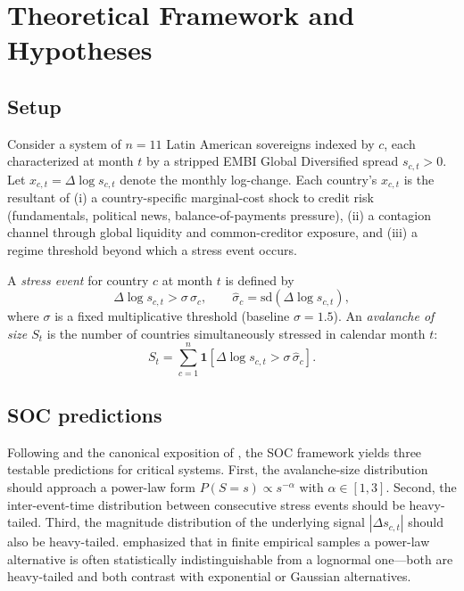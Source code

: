\documentclass[12pt,a4paper]{article}
\newcommand{\dlogs}{\Delta\log s}
\begin{document}
\section{Theoretical Framework and Hypotheses}
\label{sec:theory}

\subsection{Setup}
Consider a system of $n=11$ Latin American sovereigns indexed by $c$, each
characterized at month $t$ by a stripped EMBI Global Diversified spread
$s_{c,t}>0$. Let $x_{c,t}=\dlogs_{c,t}$ denote the monthly log-change. Each
country's $x_{c,t}$ is the resultant of (i) a country-specific marginal-cost
shock to credit risk (fundamentals, political news, balance-of-payments
pressure), (ii) a contagion channel through global liquidity and
common-creditor exposure, and (iii) a regime threshold beyond which a stress
event occurs.

A \emph{stress event} for country $c$ at month $t$ is defined by
\begin{equation}
\dlogs_{c,t} > \sigma\,\hat{\sigma}_c, \qquad
\hat{\sigma}_c = \mathrm{sd}\!\left(\dlogs_{c,t}\right),
\label{eq:stress_def}
\end{equation}
where $\sigma$ is a fixed multiplicative threshold (baseline $\sigma=1.5$). An
\emph{avalanche of size $S_t$} is the number of countries simultaneously
stressed in calendar month $t$:
\begin{equation}
S_t = \sum_{c=1}^{n} \mathbf{1}\!\left[\dlogs_{c,t} > \sigma\,\hat{\sigma}_c\right].
\label{eq:avalanche_def}
\end{equation}

\subsection{SOC predictions}
Following \citet{BTW1987, BTW1988} and the canonical exposition of
\citet{Bak1996}, the SOC framework yields three testable predictions for
critical systems. First, the avalanche-size distribution should approach a
power-law form $P(S=s)\propto s^{-\alpha}$ with $\alpha\in[1,3]$. Second, the
inter-event-time distribution between consecutive stress events should be
heavy-tailed. Third, the magnitude distribution of the underlying signal
$|\Delta s_{c,t}|$ should also be heavy-tailed. \citet{StumpfPorter2012}
emphasized that in finite empirical samples a power-law alternative is often
statistically indistinguishable from a lognormal one---both are heavy-tailed
and both contrast with exponential or Gaussian alternatives.
\end{document}
